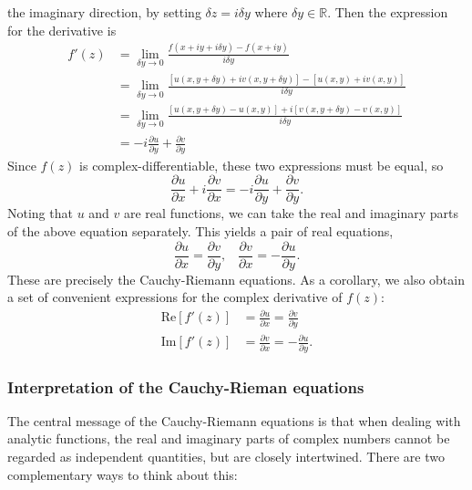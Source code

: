 \documentclass[10pt,a4paper]{article}
\begin{document}
the imaginary direction, by setting $\delta z = i \delta y$ where
$\delta y \in \mathbb{R}$. Then the expression for the derivative is
\begin{align}
  f'(z) &= \lim_{\delta y \rightarrow 0} \frac{f(x+ i y + i\delta y) - f(x + i y)}{i\delta y} \\
  &= \lim_{\delta y \rightarrow 0} \frac{\left[u(x, y+\delta y) + iv(x, y+\delta y)\right] - \left[u(x, y) + i v(x,y)\right]}{i\delta y}\\
  &= \lim_{\delta y \rightarrow 0} \frac{\left[u(x, y+\delta y) - u(x,y)\right] + i \left[v(x, y+\delta y)-v(x,y)\right]}{i\delta y} \\
  & = -i\frac{\partial u}{\partial y} + \frac{\partial v}{\partial y}
\end{align}
Since $f(z)$ is complex-differentiable, these two expressions must be
equal, so
\begin{equation}
\frac{\partial u}{\partial x} + i \frac{\partial v}{\partial x} = -i\frac{\partial u}{\partial y} + \frac{\partial v}{\partial y}.
\end{equation}
Noting that $u$ and $v$ are real functions, we can take the real and
imaginary parts of the above equation separately. This yields a pair of
real equations,
\begin{equation}
\frac{\partial u}{\partial x} = \frac{\partial v}{\partial y}, \;\;\; \frac{\partial v}{\partial x} = -\frac{\partial u}{\partial y}.
\end{equation}
These are precisely the Cauchy-Riemann equations. As a corollary, we
also obtain a set of convenient expressions for the complex derivative
of $f(z)$:
\begin{align}
  \mathrm{Re}\left[f'(z)\right] &= \frac{\partial u}{\partial x} = \frac{\partial v}{\partial y} \\
  \mathrm{Im}\left[f'(z)\right] &= \frac{\partial v}{\partial x} = -\frac{\partial u}{\partial y}.
\end{align}

\subsubsection{Interpretation of the Cauchy-Rieman equations}
\label{interpretation-of-the-cauchy-riemann-equations}

The central message of the Cauchy-Riemann equations is that when
dealing with analytic functions, the real and imaginary parts of
complex numbers cannot be regarded as independent quantities, but are
closely intertwined. There are two complementary ways to think about
this:
\end{document}
